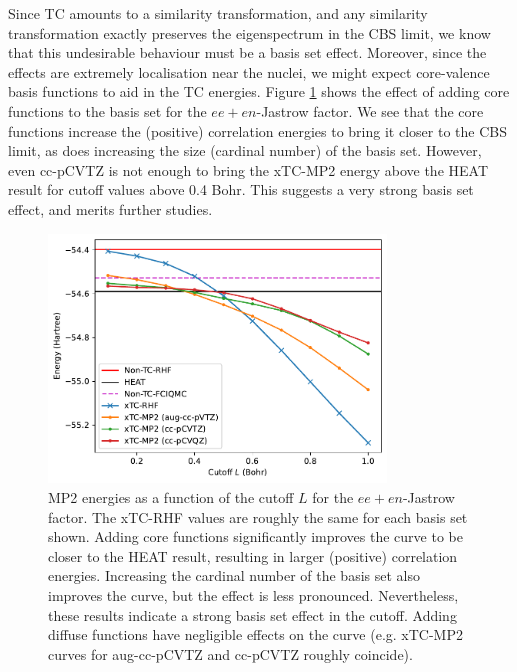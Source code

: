 Since TC amounts to a similarity transformation, and any similarity transformation exactly preserves the eigenspectrum in the CBS limit, we know that this undesirable behaviour must be a basis set effect. Moreover, since the effects are extremely localisation near the nuclei, we might expect core-valence basis functions to aid in the TC energies. Figure \ref{fig:basis-vs-cutoff} shows the effect of adding core functions to the basis set for the $ee+en$-Jastrow factor. We see that the core functions increase the (positive) correlation energies to bring it closer to the CBS limit, as does increasing the size (cardinal number) of the basis set. However, even cc-pCVTZ is not enough to bring the xTC-MP2 energy above the HEAT result for cutoff values above 0.4 Bohr. This suggests a very strong basis set effect, and merits further studies.

\begin{figure}[h!]
    \centering
    \includegraphics[width=0.8\textwidth]{figures/universal/cutoffs_basis.pdf}
    \caption{MP2 energies as a function of the cutoff $L$ for the $ee+en$-Jastrow factor. The xTC-RHF values are roughly the same for each basis set shown. Adding core functions significantly improves the curve to be closer to the HEAT result, resulting in larger (positive) correlation energies. Increasing the cardinal number of the basis set also improves the curve, but the effect is less pronounced. Nevertheless, these results indicate a strong basis set effect in the cutoff.
    Adding diffuse functions have negligible effects on the curve (e.g. xTC-MP2 curves for aug-cc-pCVTZ and cc-pCVTZ roughly coincide).}
    \label{fig:basis-vs-cutoff}
\end{figure}


